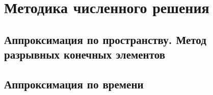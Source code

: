 \section{Методика численного решения}
\subsection{Аппроксимация по пространству. Метод разрывных конечных элементов}
\subsection{Аппроксимация по времени}
